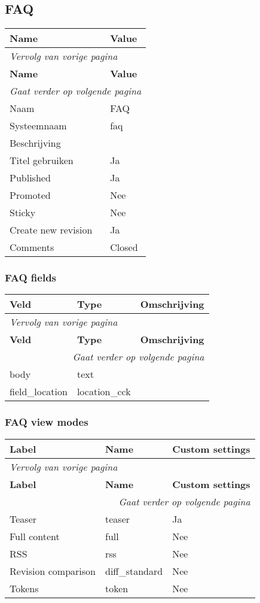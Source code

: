 \subsection{FAQ}
\label{sec:content-faq}
  \begin{longtable}{| p{7.50cm}|p{7.50cm}|}
  \hline
  \rowcolor{tableheader}
  \textbf{Name} & \textbf{Value}  \tabularnewline
  \hline
\endfirsthead
\multicolumn{2}{l}{\textit{Vervolg van vorige pagina}} \\
\hline
\rowcolor{tableheader}
  \textbf{Name} & \textbf{Value}  \tabularnewline
  \hline
\hline
\endhead
\multicolumn{2}{r}{\textit{Gaat verder op volgende pagina}} \\
\endfoot
\hline
\endlastfoot
  Naam & FAQ  \tabularnewline
  \hline
  Systeemnaam & faq  \tabularnewline
  \hline
  Beschrijving &   \tabularnewline
  \hline
  Titel gebruiken & Ja  \tabularnewline
  \hline
  Published & Ja  \tabularnewline
  \hline
  Promoted & Nee  \tabularnewline
  \hline
  Sticky & Nee  \tabularnewline
  \hline
  Create new revision & Ja  \tabularnewline
  \hline
  Comments & Closed  \tabularnewline
  \hline
  \end{longtable}

\subsubsection{FAQ fields}
  \begin{longtable}{| p{5.00cm}|p{5.00cm}|p{5.00cm}|}
  \hline
  \rowcolor{tableheader}
  \textbf{Veld} & \textbf{Type} & \textbf{Omschrijving}  \tabularnewline
  \hline
\endfirsthead
\multicolumn{3}{l}{\textit{Vervolg van vorige pagina}} \\
\hline
\rowcolor{tableheader}
  \textbf{Veld} & \textbf{Type} & \textbf{Omschrijving}  \tabularnewline
  \hline
\hline
\endhead
\multicolumn{3}{r}{\textit{Gaat verder op volgende pagina}} \\
\endfoot
\hline
\endlastfoot
  body & text &   \tabularnewline
  \hline
  field\_location & location\_cck &   \tabularnewline
  \hline
  \end{longtable}

\subsubsection{FAQ view modes}
  \begin{longtable}{| p{5.00cm}|p{5.00cm}|p{5.00cm}|}
  \hline
  \rowcolor{tableheader}
  \textbf{Label} & \textbf{Name} & \textbf{Custom settings}  \tabularnewline
  \hline
\endfirsthead
\multicolumn{3}{l}{\textit{Vervolg van vorige pagina}} \\
\hline
\rowcolor{tableheader}
  \textbf{Label} & \textbf{Name} & \textbf{Custom settings}  \tabularnewline
  \hline
\hline
\endhead
\multicolumn{3}{r}{\textit{Gaat verder op volgende pagina}} \\
\endfoot
\hline
\endlastfoot
  Teaser & teaser & Ja  \tabularnewline
  \hline
  Full content & full & Nee  \tabularnewline
  \hline
  RSS & rss & Nee  \tabularnewline
  \hline
  Revision comparison & diff\_standard & Nee  \tabularnewline
  \hline
  Tokens & token & Nee  \tabularnewline
  \hline
  \end{longtable}

